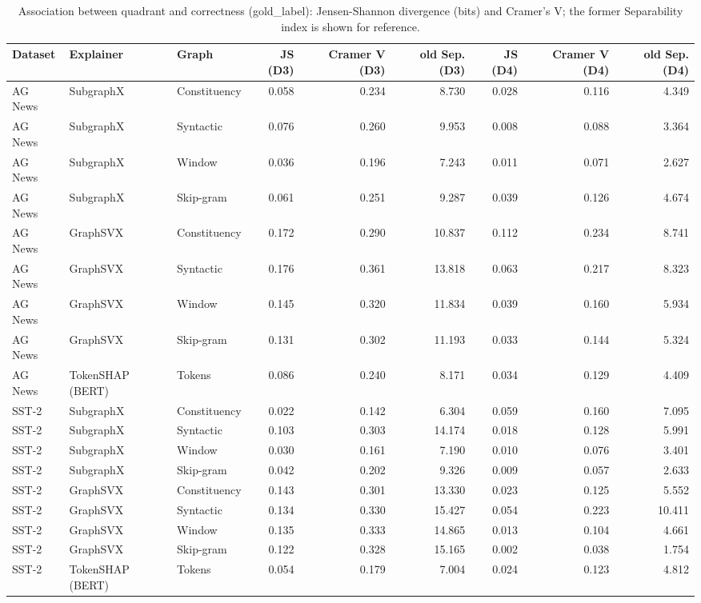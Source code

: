 \begin{table}[H]
\centering
\small
\caption{Association between quadrant and correctness (gold_label): Jensen-Shannon divergence (bits) and Cramer's V; the former Separability index is shown for reference.}
\label{tab:quadrants_gold_label}
\begin{tabular}{lllrrrrrr}
\toprule
Dataset & Explainer & Graph & JS (D3) & Cramer V (D3) & old Sep. (D3) & JS (D4) & Cramer V (D4) & old Sep. (D4) \\
\midrule
AG News & SubgraphX & Constituency & 0.058 & 0.234 & 8.730 & 0.028 & 0.116 & 4.349 \\
AG News & SubgraphX & Syntactic & 0.076 & 0.260 & 9.953 & 0.008 & 0.088 & 3.364 \\
AG News & SubgraphX & Window & 0.036 & 0.196 & 7.243 & 0.011 & 0.071 & 2.627 \\
AG News & SubgraphX & Skip-gram & 0.061 & 0.251 & 9.287 & 0.039 & 0.126 & 4.674 \\
AG News & GraphSVX & Constituency & 0.172 & 0.290 & 10.837 & 0.112 & 0.234 & 8.741 \\
AG News & GraphSVX & Syntactic & 0.176 & 0.361 & 13.818 & 0.063 & 0.217 & 8.323 \\
AG News & GraphSVX & Window & 0.145 & 0.320 & 11.834 & 0.039 & 0.160 & 5.934 \\
AG News & GraphSVX & Skip-gram & 0.131 & 0.302 & 11.193 & 0.033 & 0.144 & 5.324 \\
AG News & TokenSHAP (BERT) & Tokens & 0.086 & 0.240 & 8.171 & 0.034 & 0.129 & 4.409 \\
SST-2 & SubgraphX & Constituency & 0.022 & 0.142 & 6.304 & 0.059 & 0.160 & 7.095 \\
SST-2 & SubgraphX & Syntactic & 0.103 & 0.303 & 14.174 & 0.018 & 0.128 & 5.991 \\
SST-2 & SubgraphX & Window & 0.030 & 0.161 & 7.190 & 0.010 & 0.076 & 3.401 \\
SST-2 & SubgraphX & Skip-gram & 0.042 & 0.202 & 9.326 & 0.009 & 0.057 & 2.633 \\
SST-2 & GraphSVX & Constituency & 0.143 & 0.301 & 13.330 & 0.023 & 0.125 & 5.552 \\
SST-2 & GraphSVX & Syntactic & 0.134 & 0.330 & 15.427 & 0.054 & 0.223 & 10.411 \\
SST-2 & GraphSVX & Window & 0.135 & 0.333 & 14.865 & 0.013 & 0.104 & 4.661 \\
SST-2 & GraphSVX & Skip-gram & 0.122 & 0.328 & 15.165 & 0.002 & 0.038 & 1.754 \\
SST-2 & TokenSHAP (BERT) & Tokens & 0.054 & 0.179 & 7.004 & 0.024 & 0.123 & 4.812 \\
\bottomrule
\end{tabular}
\end{table}

